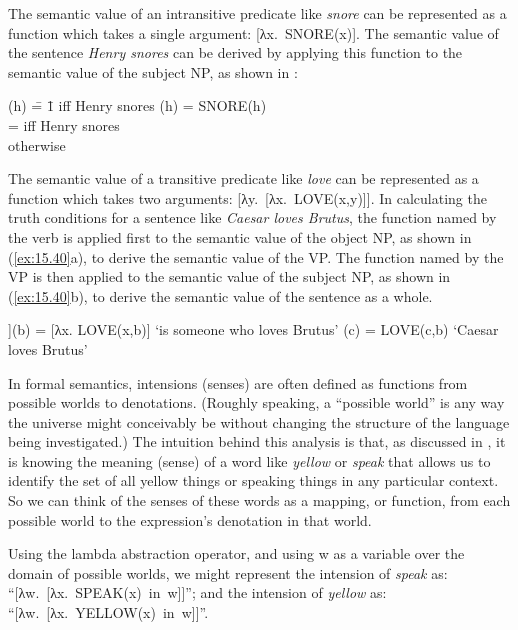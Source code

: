 The semantic value of an intransitive predicate like \textit{snore} can be represented as a function which takes a single argument: [λx.~SNORE(x)]. The semantic value of the sentence \textit{Henry snores} can be derived by applying this function to the semantic value of the subject NP, as shown in :


\ea \label{ex:15.39}
\begin{tabbing}\relax
[λx. SNORE(x)](h)  \= = \=  1 iff Henry snores \kill
[λx. SNORE(x)](h)  \> = \>  SNORE(h)\\
                   \> =  iff Henry snores\\
                   \>    otherwise
\end{tabbing}
\z


The semantic value of a transitive predicate like \textit{love} can be represented as a function which takes two arguments: [λy.~[λx.~LOVE(x,y)]]. In calculating the truth conditions for a sentence like \textit{Caesar loves Brutus}, the function named by the verb is applied first to the semantic value of the object NP, as shown in (\ref{ex:15.40}a), to derive the semantic value of the VP. The function named by the VP is then applied to the semantic value of the subject NP, as shown in (\ref{ex:15.40}b), to derive the semantic value of the sentence as a whole.


\ea \label{ex:15.40}
\ea  [λy. [λx. LOVE(x,y)]](b) = [λx. LOVE(x,b)] ‘is someone who loves Brutus’
\ex  [λx. LOVE(x,b)](c) =  LOVE(c,b) ‘Caesar loves Brutus’
\z \z


In formal semantics, intensions (senses) are often defined as functions from possible worlds to denotations. (Roughly speaking, a “possible world” is any way the universe might conceivably be without changing the structure of the language being investigated.) The intuition behind this analysis is that, as discussed in , it is knowing the meaning (sense) of a word like \textit{yellow} or \textit{speak} that allows us to identify the set of all yellow things or speaking things in any particular context. So we can think of the senses of these words as a mapping, or function, from each possible world to the expression’s denotation in that world.



Using the lambda abstraction operator, and using w as a variable over the domain of possible worlds, we might represent the intension of \textit{speak} as: “[λw.~[λx.~SPEAK(x)~in~w]]”; and the intension of \textit{yellow} as: “[λw.~[λx.~YELLOW(x)~in~w]]”.


